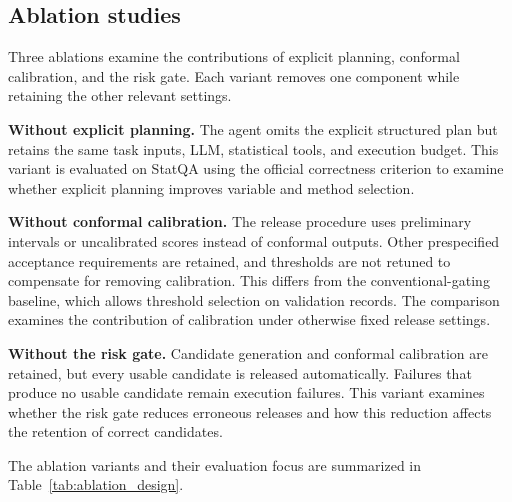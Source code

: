 \documentclass[preprint,12pt,authoryear]{elsarticle}
\begin{document}
\subsection{Ablation studies}
\label{sec:ablation_studies}

Three ablations examine the contributions of explicit planning, conformal calibration, and the risk gate. Each variant removes one component while retaining the other relevant settings.

\textbf{Without explicit planning.}
The agent omits the explicit structured plan but retains the
same task inputs, LLM, statistical tools, and execution budget. This variant is evaluated on StatQA using the official correctness criterion to examine whether explicit planning improves variable and method selection.

\textbf{Without conformal calibration.}
The release procedure uses preliminary intervals or uncalibrated scores instead of conformal outputs. Other prespecified acceptance requirements are retained, and thresholds are not retuned to compensate for removing calibration. This differs from the conventional-gating baseline, which allows threshold selection on validation records. The comparison examines the contribution of calibration under otherwise fixed release settings.

\textbf{Without the risk gate.}
Candidate generation and conformal calibration are retained, but every usable candidate is released automatically. Failures that produce no usable candidate remain execution failures. This variant examines whether the risk gate reduces erroneous releases and how this reduction affects the retention of correct candidates.

The ablation variants and their evaluation focus are summarized in Table~\ref{tab:ablation_design}.
\end{document}
